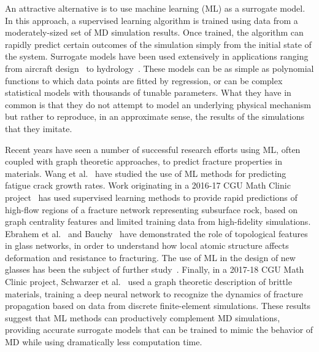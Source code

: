 An attractive alternative is to use machine learning (ML) as a surrogate model.  In this approach, a supervised learning algorithm is trained using data from a moderately-sized set of MD simulation results.  Once trained, the algorithm can rapidly predict certain outcomes of the simulation simply from the initial state of the system.  Surrogate models have been used extensively in applications ranging from aircraft design~\cite{mack2007surrogate} to hydrology~\cite{razavi2012review}.  These models can be as simple as polynomial functions to which data points are fitted by regression, or can be complex statistical models with thousands of tunable parameters.  What they have in common is that they do not attempt to model an underlying physical mechanism but rather to reproduce, in an approximate sense, the results of the simulations that they imitate.

Recent years have seen a number of successful research efforts using ML, often coupled with graph theoretic approaches, to predict fracture properties in materials. Wang et al.~\cite{MLACrack} have studied the use of ML methods for predicting fatigue crack growth rates. Work originating in a 2016-17 CGU Math Clinic project~\cite{valera2018machine,TopSystem} has used supervised learning methods to provide rapid predictions of high-flow regions of a fracture network representing subsurface rock, based on graph centrality features and limited training data from high-fidelity simulations.  Ebrahem et al.~\cite{ebrahem2018influence} and Bauchy~\cite{bauchy} have demonstrated the role of topological features in glass networks, in order to understand how local atomic structure affects deformation and resistance to fracturing.  The use of ML in the design of new glasses has been the subject of further study~\cite{liu2019machine}.  Finally, in a 2017-18 CGU Math Clinic project, Schwarzer et al.~\cite{schwarzer2019learning} used a graph theoretic description of brittle materials, training a deep neural network to recognize the dynamics of fracture propagation based on data from discrete finite-element simulations.  These results suggest that ML methods can productively complement MD simulations, providing accurate surrogate models that can be trained to mimic the behavior of MD while using dramatically less computation time.


